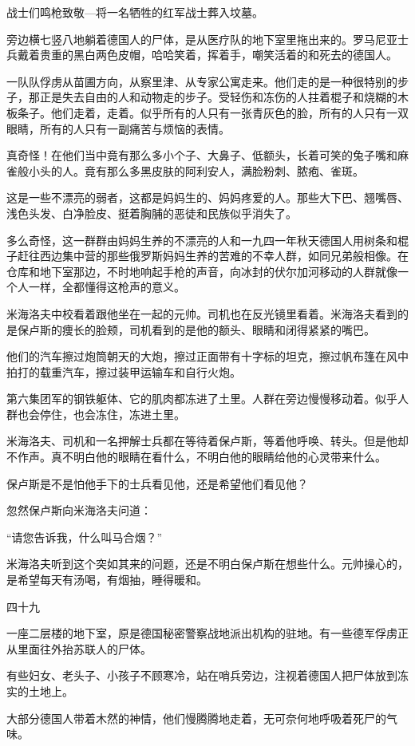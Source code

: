 战士们鸣枪致敬—将一名牺牲的红军战士葬入坟墓。

旁边横七竖八地躺着德国人的尸体，是从医疗队的地下室里拖出来的。罗马尼亚士兵戴着贵重的黑白两色皮帽，哈哈笑着，挥着手，嘲笑活着的和死去的德国人。

一队队俘虏从苗圃方向，从察里津、从专家公寓走来。他们走的是一种很特别的步子，那正是失去自由的人和动物走的步子。受轻伤和冻伤的人拄着棍子和烧糊的木板条子。他们走着，走着。似乎所有的人只有一张青灰色的脸，所有的人只有一双眼睛，所有的人只有一副痛苦与烦恼的表情。

真奇怪！在他们当中竟有那么多小个子、大鼻子、低额头，长着可笑的兔子嘴和麻雀般小头的人。竟有那么多黑皮肤的阿利安人，满脸粉刺、脓疱、雀斑。

这是一些不漂亮的弱者，这都是妈妈生的、妈妈疼爱的人。那些大下巴、翘嘴唇、浅色头发、白净脸皮、挺着胸脯的恶徒和民族似乎消失了。

多么奇怪，这一群群由妈妈生养的不漂亮的人和一九四一年秋天德国人用树条和棍子赶往西边集中营的那些俄罗斯妈妈生养的苦难的不幸人群，如同兄弟般相像。在仓库和地下室那边，不时地响起手枪的声音，向冰封的伏尔加河移动的人群就像一个人一样，全都懂得这枪声的意义。

米海洛夫中校看着跟他坐在一起的元帅。司机也在反光镜里看着。米海洛夫看到的是保卢斯的痩长的脸颊，司机看到的是他的额头、眼睛和闭得紧紧的嘴巴。

他们的汽车擦过炮筒朝天的大炮，擦过正面带有十字标的坦克，擦过帆布篷在风中拍打的载重汽车，擦过装甲运输车和自行火炮。

第六集团军的钢铁躯体、它的肌肉都冻进了土里。人群在旁边慢慢移动着。似乎人群也会停住，也会冻住，冻进土里。

米海洛夫、司机和一名押解士兵都在等待着保卢斯，等着他呼唤、转头。但是他却不作声。真不明白他的眼睛在看什么，不明白他的眼睛给他的心灵带来什么。

保卢斯是不是怕他手下的士兵看见他，还是希望他们看见他？

忽然保卢斯向米海洛夫问道：

“请您告诉我，什么叫马合烟？”

米海洛夫听到这个突如其来的问题，还是不明白保卢斯在想些什么。元帅操心的，是希望每天有汤喝，有烟抽，睡得暖和。

四十九

一座二层楼的地下室，原是德国秘密警察战地派出机构的驻地。有一些德军俘虏正从里面往外抬苏联人的尸体。

有些妇女、老头子、小孩子不顾寒冷，站在哨兵旁边，注视着德国人把尸体放到冻实的土地上。

大部分德国人带着木然的神情，他们慢腾腾地走着，无可奈何地呼吸着死尸的气味。

